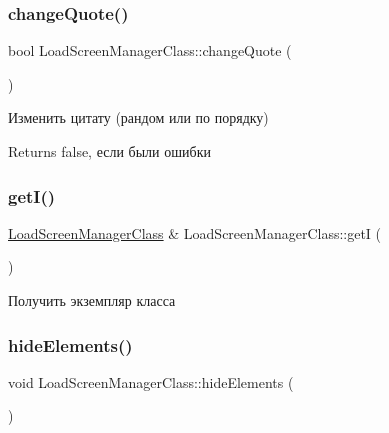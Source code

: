 \subsubsection{\texorpdfstring{change\+Quote()}{changeQuote()}}
{\footnotesize\ttfamily bool Load\+Screen\+Manager\+Class\+::change\+Quote (\begin{DoxyParamCaption}{ }\end{DoxyParamCaption})\hspace{0.3cm}{\ttfamily [private]}}



Изменить цитату (рандом или по порядку) 

\begin{DoxyReturn}{Returns}
false, если были ошибки 
\end{DoxyReturn}
\mbox{\label{class_load_screen_manager_class_afd2c1e2905d518a3b1f307de9d598911}} 
\subsubsection{\texorpdfstring{get\+I()}{getI()}}
{\footnotesize\ttfamily \hyperlink{class_load_screen_manager_class}{Load\+Screen\+Manager\+Class} \& Load\+Screen\+Manager\+Class\+::getI (\begin{DoxyParamCaption}{ }\end{DoxyParamCaption})\hspace{0.3cm}{\ttfamily [static]}}



Получить экземпляр класса 

\mbox{\label{class_load_screen_manager_class_af2a306e3f2b0028e838ed76a032e6b75}} 
\subsubsection{\texorpdfstring{hide\+Elements()}{hideElements()}}
{\footnotesize\ttfamily void Load\+Screen\+Manager\+Class\+::hide\+Elements (\begin{DoxyParamCaption}{ }\end{DoxyParamCaption})}



